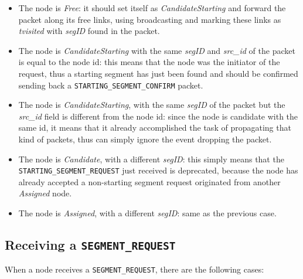 \begin{itemize}
\item The node is \emph{Free}: it should set itself as
\emph{CandidateStarting} and forward the packet along its free links, using
broadcasting and marking these links as \emph{tvisited} with \emph{segID} found
in the packet.
\item The node is \emph{CandidateStarting} with the same
\emph{segID} and \emph{src\_id} of the packet is equal to the node id:
this means that the node was the initiator of the request, thus a starting segment has
just been found and should be confirmed sending back a \texttt{STARTING\_SEGMENT\_CONFIRM}
packet.  
\item The node is \emph{CandidateStarting}, with the same \emph{segID} of the
packet but the \emph{src\_id} field is different from the node id: since the node is candidate with the same id, it means
that it already accomplished the task of propagating that kind of
packets, thus can simply ignore the event dropping the packet.  
\item The node is \emph{Candidate}, with a different \emph{segID}: 
this simply means that the \texttt{STARTING\_SEGMENT\_REQUEST} just received is deprecated,
because the node has already accepted a non-starting segment request originated from another \emph{Assigned} node.
\item The node is \emph{Assigned}, with a different \emph{segID}:
same as the previous case. 


\end{itemize}

\subsection{Receiving a \texttt{SEGMENT\_REQUEST}}
When a node receives a \texttt{SEGMENT\_REQUEST}, there are the following cases:


